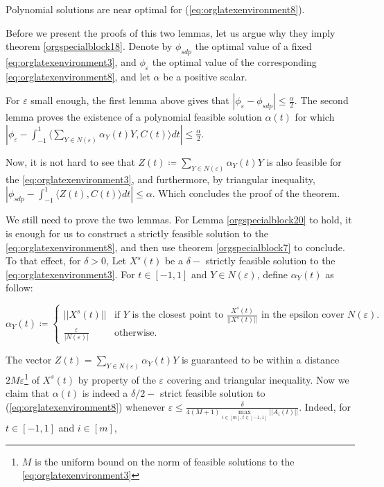 \documentclass[moor]{informs1}
\begin{document}
\begin{lemma}
Polynomial solutions are near optimal for (\ref{eq:orglatexenvironment8}).
\label{orgspecialblock20}

\end{lemma}

Before we present the proofs of this two lemmas, let us argue why they imply theorem \ref{orgspecialblock18}. Denote by \(\phi_{sdp}\) the optimal value of a fixed \ref{eq:orglatexenvironment3}, and \(\phi_{\varepsilon}\) the optimal value of the corresponding \ref{eq:orglatexenvironment8}, and let \(\alpha\) be a positive scalar.

For \(\varepsilon\) small enough, the first lemma above gives that \(|\phi_{\varepsilon} - \phi_{sdp}| \le \frac{\alpha}2\). The second lemma proves the existence of a polynomial feasible solution \(\alpha(t)\) for which \(|\phi_{\varepsilon} - \int_{-1}^1 \langle \sum_{Y \in N(\varepsilon)} \alpha_Y(t) Y, C(t) \rangle dt| \le \frac \alpha 2\).

Now, it is not hard to see that \(Z(t) \coloneqq \sum_{Y \in N(\varepsilon)} \alpha_Y(t) Y\) is also feasible for the \ref{eq:orglatexenvironment3}, and furthermore, by triangular inequality, \(|\phi_{sdp} - \int_{-1}^1 \langle Z(t), C(t) \rangle dt| \le \alpha\). Which concludes the proof of the theorem.

We still need to prove the two lemmas. For Lemma \ref{orgspecialblock20} to hold, it is enough for us to construct a strictly feasible solution to the \ref{eq:orglatexenvironment8}, and then use theorem \ref{orgspecialblock7} to conclude. To that effect, for \(\delta > 0\), Let \(X^{s}(t)\) be a \(\delta-\) strictly feasible solution to the \ref{eq:orglatexenvironment3}. For \(t \in [-1, 1]\) and \(Y \in N(\varepsilon)\), define \(\alpha_Y(t)\) as follow:

\[\alpha_Y(t) \coloneqq \left\{\begin{array}{ll}||X^{s}(t)|| & \text{if $Y$ is the closest point to $\frac{X^s(t)}{||X^{s}(t)||}$ in the epsilon cover $N(\varepsilon)$.}\\\frac{\varepsilon}{|N(\varepsilon)|} & \text{otherwise.}\end{array}\right.\]

The vector \(Z(t) = \sum_{Y \in N(\varepsilon)} \alpha_Y(t) Y\) is guaranteed to be within a distance \(2M \varepsilon\)\footnote{\(M\) is the uniform bound on the norm of feasible solutions to the \ref{eq:orglatexenvironment3}} of \(X^{s}(t)\) by property of the \(\varepsilon\) covering and triangular inequality. Now we claim that \(\alpha(t)\) is indeed a \(\delta/2-\) strict feasible solution to (\ref{eq:orglatexenvironment8}) whenever \(\varepsilon \le \frac{\delta} {4(M+1) \underset{i\in[m], t \in [-1, 1]}{\max}||A_i(t)||}\). Indeed, for \(t \in [-1, 1]\) and \(i \in [m]\),
\end{document}
